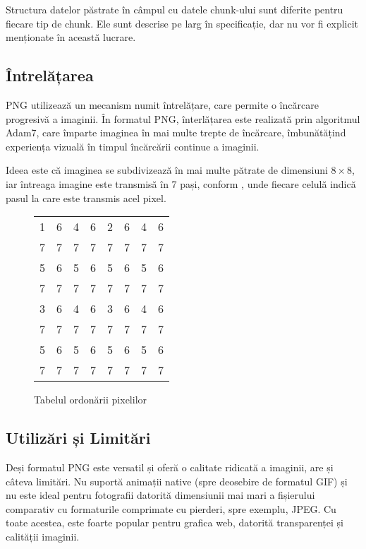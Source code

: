 \documentclass[a4paper,12pt]{report}
\begin{document}
Structura datelor păstrate în câmpul cu datele chunk-ului sunt diferite pentru fiecare tip de chunk.
Ele sunt descrise pe larg în specificație, dar nu vor fi explicit menționate în această lucrare.

\subsection{Întrelățarea}

\ac{PNG} utilizează un mecanism numit întrelățare,
care permite o încărcare progresivă a imaginii.
În formatul \ac{PNG}, înterlățarea este realizată prin algoritmul Adam7,
care împarte imaginea în mai multe trepte de încărcare,
îmbunătățind experiența vizuală în timpul încărcării continue a imaginii.

Ideea este că imaginea se subdivizează în mai multe pătrate de dimensiuni $8 \times 8$,
iar întreaga imagine este transmisă în 7 pași, conform , unde
fiecare celulă indică pasul la care este transmis acel pixel.

\begin{figure}[!ht]
\centering
\begin{tabular}{c c c c c c c c}
    1 & 6 & 4 & 6 & 2 & 6 & 4 & 6 \\
    7 & 7 & 7 & 7 & 7 & 7 & 7 & 7 \\
    5 & 6 & 5 & 6 & 5 & 6 & 5 & 6 \\
    7 & 7 & 7 & 7 & 7 & 7 & 7 & 7 \\
    3 & 6 & 4 & 6 & 3 & 6 & 4 & 6 \\
    7 & 7 & 7 & 7 & 7 & 7 & 7 & 7 \\
    5 & 6 & 5 & 6 & 5 & 6 & 5 & 6 \\
    7 & 7 & 7 & 7 & 7 & 7 & 7 & 7 \\
\end{tabular}
\caption{Tabelul ordonării pixelilor}
\label{fig:pixel_order_table}
\end{figure}

\subsection{Utilizări și Limitări}

Deși formatul \ac{PNG} este versatil și oferă o calitate ridicată a imaginii, are și câteva limitări.
Nu suportă animații native (spre deosebire de formatul \ac{GIF})
și nu este ideal pentru fotografii datorită dimensiunii mai mari a fișierului comparativ
cu formaturile comprimate cu pierderi, spre exemplu, \ac{JPEG}.
Cu toate acestea, este foarte popular pentru grafica web,
datorită transparenței și calității imaginii.
\end{document}
